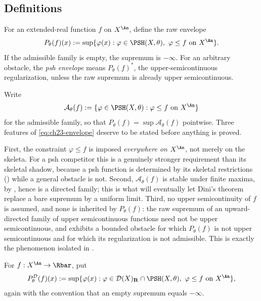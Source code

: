 \subsection{Definitions}
\label{sec:ch23-definitions}

\begin{definition}\label{def:ch23-envelope}
For an extended-real function $f$ on $X^{\An}$, define the raw envelope
\begin{equation}\label{eq:ch23-envelope}
 P_\theta(f)(x)
 :=\sup\{\varphi(x):
          \varphi\in\PSH(X,\theta),\ \varphi\leq f\text{ on }X^{\An}\}.
\end{equation}
If the admissible family is empty, the supremum is $-\infty$.  For an
arbitrary obstacle, the \emph{psh envelope} means
$P_\theta(f)^*$, the upper-semicontinuous regularization, unless the raw
supremum is already upper semicontinuous.
\end{definition}

Write
\begin{equation}\label{eq:ch23-admissible-family}
 \mathcal A_\theta(f)
 :=\{\varphi\in\PSH(X,\theta):\varphi\leq f\text{ on }X^{\An}\}
\end{equation}
for the admissible family, so that $P_\theta(f)=\sup\mathcal A_\theta(f)$
pointwise.  Three features of \eqref{eq:ch23-envelope} deserve to be stated
before anything is proved.

First, the constraint $\varphi\leq f$ is imposed \emph{everywhere on
$X^{\An}$}, not merely on the skeleta.  For a psh competitor this is a
genuinely stronger requirement than its skeletal shadow, because a psh
function is determined by its skeletal restrictions
() while a general obstacle is not.
Second, $\mathcal A_\theta(f)$ is stable under finite maxima, by
, hence is a directed family; this is
what will eventually let Dini's theorem replace a bare supremum by a uniform
limit.  Third, no upper semicontinuity of $f$ is assumed, and none is
inherited by $P_\theta(f)$: the raw supremum of an upward-directed family
of upper semicontinuous functions need not be upper semicontinuous, and
 exhibits a bounded obstacle for
which $P_\theta(f)$ is not upper semicontinuous and for which its
regularization is not admissible.  This is exactly the phenomenon isolated in
.

\begin{definition}
\label{def:ch23-model-envelope}
For $f:X^{\An}\to\Rbar$, put
\begin{equation}\label{eq:ch23-model-envelope}
 P^{\mathcal D}_\theta(f)(x)
 :=\sup\{\varphi(x):
   \varphi\in\mathcal D(X)_{\mathbf R}\cap\PSH(X,\theta),\
   \varphi\leq f\text{ on }X^{\An}\},
\end{equation}
again with the convention that an empty supremum equals $-\infty$.
\end{definition}

